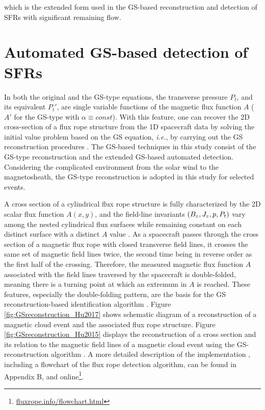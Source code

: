 which is the extended form used in the GS-based reconstruction and detection of SFRs with significant remaining flow.

\section{Automated GS-based detection of SFRs}\label{sec:GS-detection}
In both the original and the GS-type equations, the transverse pressure $P_t$, and its equivalent $P_t'$, are single variable functions of the magnetic flux function $A$ ($A'$ for the GS-type with $\alpha\equiv const$). With this feature, one can recover the 2D cross-section of a flux rope structure from the 1D spacecraft data by solving the initial value problem based on the GS equation, \textit{i.e.}, by carrying out the GS reconstruction procedures \citep{Hau:1999, HuSonnerup:2002, Hu:2017}. The GS-based techniques in this study consist of the GS-type reconstruction and the extended GS-based automated detection. Considering the complicated environment from the solar wind to the magnetosheath, the GS-type reconstruction is adopted in this study for selected events.

A cross section of a cylindrical flux rope structure is fully characterized by the 2D scalar flux function $A(x, y)$, and the field-line invariants $\left( B_z,J_z,p, P_t \right)$ vary among the nested cylindrical flux surfaces while remaining constant on each distinct surface with a distinct $A$ value \citep{Hu:2018}. As a spacecraft passes through the cross section of a magnetic flux rope with closed transverse field lines, it crosses the same set of magnetic field lines twice, the second time being in reverse order as the first half of the crossing. Therefore, the measured magnetic flux function $A$ associated with the field lines traversed by the spacecraft is double-folded, meaning there is a turning point at which an extremum in $A$ is reached. These features, especially the double-folding pattern, are the basis for the GS reconstruction-based identification algorithm \citep{Hu:2018}. Figure \ref{fig:GSreconstruction_Hu2017} shows schematic diagram of a reconstruction of a magnetic cloud event and the associated flux rope structure. Figure \ref{fig:GSreconstruction_Hu2015} displays the reconstruction of a cross section and its relation to the magnetic field lines of a magnetic cloud event using the GS-reconstruction algorithm \citep{Hu:2015,Hu:2018}. A more detailed description of the implementation \citep{Hu:2018}, including a flowchart of the flux rope detection algorithm, can be found in Appendix B, and online\footnote{\url{fluxrope.info/flowchart.html}}. %

